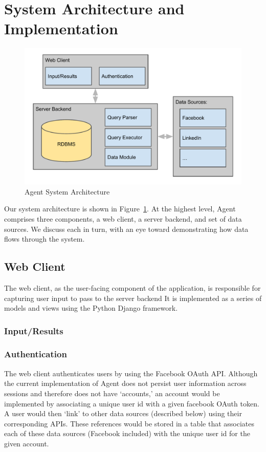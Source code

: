\section{System Architecture and Implementation}
\label{sec:architecture}

\begin{figure}[!h]
\begin{center}
\includegraphics[width=0.75\linewidth]{figs/sysarch.pdf}
\caption{Agent System Architecture}
\label{fig:sysarch}
\end{center}
\end{figure}

Our system architecture is shown in Figure~\ref{fig:sysarch}. At the highest
level, Agent comprises three components, a web client, a server backend, and set
of data sources. We discuss each in turn, with an eye toward demonstrating how
data flows through the system.

\subsection{Web Client}
The web client, as the user-facing component of the application, is responsible
for capturing user input to pass to the server backend  It is implemented as a
series of models and views using the Python Django framework.

\subsubsection{Input/Results}

\subsubsection{Authentication}
The web client authenticates users by using the Facebook OAuth API. Although the
current implementation of Agent does not persist user information across
sessions and therefore does not have `accounts,' an account would be implemented
by associating a unique user id with a given facebook OAuth token. A user would
then `link' to other data sources (described below) using their corresponding
APIs. These references would be stored in a table that associates each of these
data sources (Facebook included) with the unique user id for the given account.

